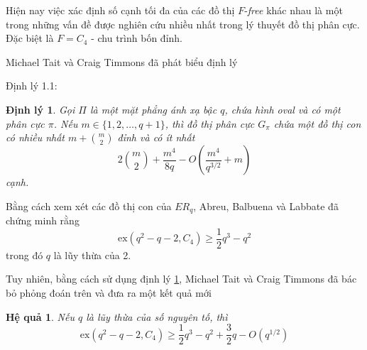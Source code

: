 \documentclass[12pt]{article}
\newtheorem{corollary}{Hệ quả}
\newtheorem{theorem}{Định lý}
\begin{document}
Hiện nay việc xác định số cạnh tối đa của các đồ thị $F$-\emph{free}  khác nhau là một trong những vấn đề được nghiên cứu nhiều nhất trong lý thuyết đồ thị phân cực. Đặc biệt là $F = C_4$ - chu trình bốn đỉnh.

Michael Tait và  Craig Timmons đã phát biểu định lý

Định lý 1.1:

\begin{theorem}\label{crass subgraph}
     Gọi $\Pi$ là một mặt phẳng ánh xạ bậc $q$, chứa hình oval và có một phân cực $\pi$. Nếu $m \in \{1,2, \dots , q + 1 \}$, thì đồ thị phân cực $G_{ \pi}$ chứa một đồ thị con có nhiều nhất $m + \binom{m}{2}$ đỉnh và có ít nhất $$ 2 \binom{m}{2} + \frac{m^4}{8q} - O \left( \frac{m^4}{q^{3/2} } + m \right) $$ cạnh.
\end{theorem}
Bằng cách xem xét các đồ thị con của $ER_q$, Abreu, Balbuena và Labbate đã chứng minh rằng
$$ \mathrm{ex}(q^2-q-2, C_4) \geq \frac{1}{2}q^3 - q^2 $$
trong đó $q$ là lũy thừa của 2.

Tuy nhiên, bằng cách sử dụng định lý \ref{crass subgraph}, Michael Tait và  Craig Timmons đã bác bỏ phỏng đoán trên và đưa ra một kết quả mới

\begin{corollary}\label{speculate}
    Nếu $q$ là lũy thừa của số nguyên tố, thì
    $$ \mathrm{ex}(q^2 - q - 2, C_4) \geq \frac{1}{2}q^3 - q^2 + \frac{3}{2}q - O\left(q^{1/2}\right) $$
\end{corollary}
\end{document}
